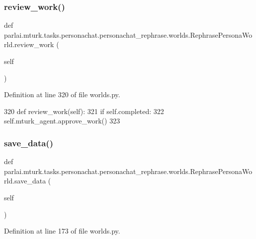 \subsubsection{\texorpdfstring{review\+\_\+work()}{review\_work()}}
{\footnotesize\ttfamily def parlai.\+mturk.\+tasks.\+personachat.\+personachat\+\_\+rephrase.\+worlds.\+Rephrase\+Persona\+World.\+review\+\_\+work (\begin{DoxyParamCaption}\item[{}]{self }\end{DoxyParamCaption})}



Definition at line 320 of file worlds.\+py.


\begin{DoxyCode}
320     \textcolor{keyword}{def }review\_work(self):
321         \textcolor{keywordflow}{if} self.completed:
322             self.mturk\_agent.approve\_work()
323 
\end{DoxyCode}
\mbox{\label{classparlai_1_1mturk_1_1tasks_1_1personachat_1_1personachat__rephrase_1_1worlds_1_1RephrasePersonaWorld_ae86cecd0a95976424b21edf2caa528af}} 
\subsubsection{\texorpdfstring{save\+\_\+data()}{save\_data()}}
{\footnotesize\ttfamily def parlai.\+mturk.\+tasks.\+personachat.\+personachat\+\_\+rephrase.\+worlds.\+Rephrase\+Persona\+World.\+save\+\_\+data (\begin{DoxyParamCaption}\item[{}]{self }\end{DoxyParamCaption})}



Definition at line 173 of file worlds.\+py.


